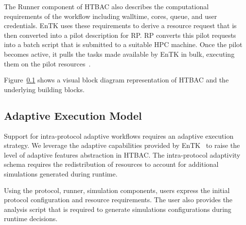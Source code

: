 
The Runner component of HTBAC also describes the computational requirements
of the workflow including walltime, cores, queue, and user credentials. EnTK
uses these requirements to derive a resource request that is then converted
into a pilot description for RP. RP converts this pilot requests into a batch
script that is submitted to a suitable HPC machine. Once the pilot becomes
active, it pulls the tasks made available by EnTK in bulk, executing them on
the pilot resources~\cite{merzky2015radical}.

Figure~\ref{} shows a visual block diagram representation  of HTBAC and the underlying building
blocks.

\subsection{Adaptive Execution Model}

Support for intra-protocol adaptive workflows requires an adaptive execution 
strategy. We leverage the adaptive capabilities provided by 
EnTK~\cite{adaptivebiomolecular} to raise the level of adaptive features 
abstraction in HTBAC. The intra-protocol adaptivity schema requires the 
redistribution of resources to account for additional simulations generated 
during runtime. 


Using the protocol, runner, simulation components, users express the initial 
protocol configuration and resource requirements. The user also provides the 
analysis script that is required to generate simulations configurations during 
runtime decisions. 

